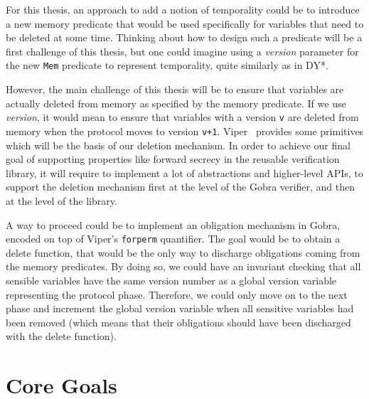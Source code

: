 \documentclass{article}
\begin{document}
For this thesis, an approach to add a notion of temporality could be to introduce a new memory predicate that would be used specifically for variables that need to be deleted at some time. Thinking about how to design such a predicate will be a first challenge of this thesis, but one could imagine using a \textit{version} parameter for the new \texttt{Mem} predicate to represent temporality, quite similarly as in DY*.

However, the main challenge of this thesis will be to ensure that variables are actually deleted from memory as specified by the memory predicate. If we use \textit{version}, it would mean to ensure that variables with a version \texttt{v} are deleted from memory when the protocol moves to version \texttt{v+1}. Viper~\cite{muller2016viper} provides some primitives  which will be the basis of our deletion mechanism. In order to achieve our final goal of supporting properties like forward secrecy in the reusable verification library, it will require to implement a lot of abstractions and higher-level APIs, to support the deletion mechanism first at the level of the Gobra verifier, and then at the level of the library.

A way to proceed could be to implement an obligation mechanism in Gobra, encoded on top of Viper's \texttt{forperm} quantifier. The goal would be to obtain a delete function, that would be the only way to discharge obligations coming from the memory predicates. By doing so, we could have an invariant checking that all sensible variables have the same version number as a global version variable representing the protocol phase. Therefore, we could only move on to the next phase and increment the global version variable when all sensitive variables had been removed (which means that their obligations should have been discharged with the delete function).

\section{Core Goals}
\end{document}
